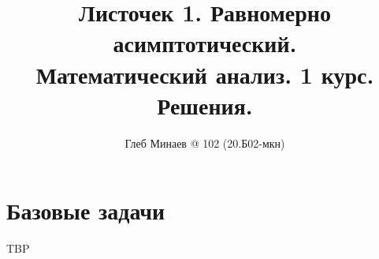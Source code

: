 \documentclass[12pt,a4paper]{article}
\title{Листочек 1. Равномерно асимптотический.\\Математический анализ. 1 курс.\\Решения.}
\author{Глеб Минаев @ 102 (20.Б02-мкн)}
\begin{document}
    \maketitle
    \section*{Базовые задачи}

    \begin{enumproblem}
        TBP


\end{enumproblem}
\end{document}
